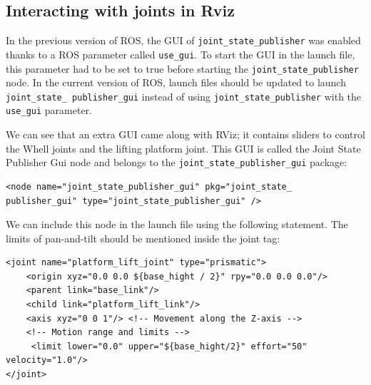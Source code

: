 \documentclass[../../main]{subfiles}
\begin{document}
\subsection{Interacting with joints in Rviz}
In the previous version of ROS, the GUI of \texttt{joint\_state\_publisher} was enabled
thanks to a ROS parameter called \texttt{use\_gui}. To start the GUI in the launch file, this
parameter had to be set to true before starting the \texttt{joint\_state\_publisher} node.
In the current version of ROS, launch files should be updated to launch \texttt{joint\_state\_
publisher\_gui} instead of using \texttt{joint\_state\_publisher} with the \texttt{use\_gui}
parameter.

We can see that an extra GUI came along with RViz; it contains sliders to control the
Whell joints and the lifting platform joint. This GUI is called the Joint State Publisher Gui node and
belongs to the \texttt{joint\_state\_publisher\_gui} package:
\begin{verbatim}
<node name="joint_state_publisher_gui" pkg="joint_state_
publisher_gui" type="joint_state_publisher_gui" />
\end{verbatim}

We can include this node in the launch file using the following statement. The limits of
pan-and-tilt should be mentioned inside the joint tag:
\newpage
\begin{verbatim}
<joint name="platform_lift_joint" type="prismatic">
    <origin xyz="0.0 0.0 ${base_hight / 2}" rpy="0.0 0.0 0.0"/>
    <parent link="base_link"/>
    <child link="platform_lift_link"/>
    <axis xyz="0 0 1"/> <!-- Movement along the Z-axis -->
    <!-- Motion range and limits -->
     <limit lower="0.0" upper="${base_hight/2}" effort="50" velocity="1.0"/> 
</joint>
\end{verbatim}
\end{document}
